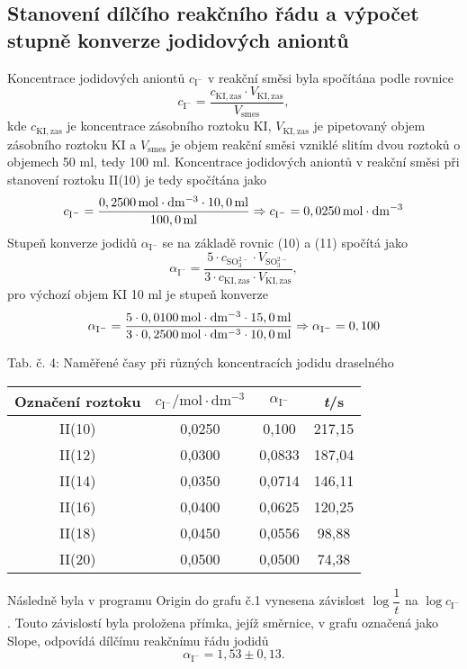 \documentclass[12pt,a4paper]{article}
\def\ri#1{\mathrm{#1}}
\def\jd#1{\ifmmode\,\mathrm{#1}\else\,\textrm{#1}\fi}
\begin{document}
\subsection*{Stanovení dílčího reakčního řádu a výpočet stupně konverze jodidových \hbox{aniontů}}
Koncentrace jodidových aniontů $c_\ri{I^-}$ v reakční směsi byla spočítána podle rovnice
\begin{equation}
	c_\ri{I^-} = \dfrac{c_\ri{KI, zas}\cdot V_\ri{KI, zas}}{V_\ri{smes}},
\end{equation}
kde $c_\ri{KI, zas}$ je koncentrace zásobního roztoku KI, $V_\ri{KI, zas}$ je pipetovaný objem zásobního roztoku KI a $V_\ri{smes}$ je objem reakční směsi vzniklé slitím dvou roztoků o objemech 50\jd{ml}, tedy 100\jd{ml}. Koncentrace jodidových aniontů v reakční směsi při stanovení roztoku II(10) je tedy spočítána jako
$$c_\ri{I^-} = \dfrac{0,2500\jd{mol\cdot dm^\ri{-3}}\cdot 10,0\jd{ml}}{100,0\jd{ml}} \Rightarrow c_\ri{I^-} = 0,0250\jd{mol\cdot dm^\ri{-3}}$$
Stupeň konverze jodidů $\alpha_\ri{I^-}$ se na základě rovnic (10) a (11) spočítá jako
\begin{equation}
	\alpha_\ri{I^-} = \dfrac{5\cdot c_\ri{SO_3^\ri{2-}}\cdot V_\ri{SO_3^\ri{2-}}}{3\cdot c_\ri{KI, zas}\cdot V_\ri{KI, zas}},
\end{equation}
pro výchozí objem KI 10\jd{ml} je stupeň konverze 
$$\alpha_\ri{I^-} = \dfrac{5\cdot 0,0100\jd{mol\cdot dm^{-3}} \cdot 15,0\jd{ml}}{3\cdot 0,2500\jd{mol\cdot dm^{-3}} \cdot 10,0\jd{ml}} \Rightarrow \alpha_\ri{I^-} = 0,100$$
\begin{center}
	\noindent Tab. č. 4: Naměřené časy při různých koncentracích jodidu draselného
	\begin{tabular}{c|c|c|c}
		Označení roztoku & $c_\ri{I^-}/\ri{mol\cdot dm^\ri{-3}}$ & $\alpha_\ri{I^-}$ & \textit{t}/s\\
		\hline
		II(10) & 0,0250 & 0,100 & 217,15\\
		II(12) & 0,0300 & 0,0833 & 187,04\\
		II(14) & 0,0350 & 0,0714 & 146,11\\
		II(16) & 0,0400 & 0,0625 & 120,25\\
		II(18) & 0,0450 & 0,0556 & 98,88\\
		II(20) & 0,0500 & 0,0500 & 74,38\\
	\end{tabular}
\end{center}
Následně byla v programu Origin do grafu č.1 vynesena závislost $\log \dfrac{1}{t}$ na $\log c_\ri{I^-}$. Touto závislostí byla proložena přímka, jejíž směrnice, v grafu označená jako Slope, odpovídá dílčímu reakčnímu řádu jodidů
\begin{equation}
	\alpha_\ri{I^-} = 1,53 \pm 0,13.
\end{equation}
\end{document}
